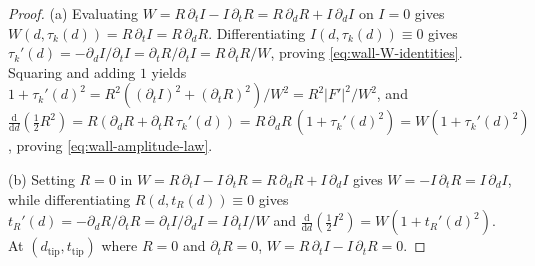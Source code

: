 \documentclass[11pt,reqno]{amsart}
\theoremstyle{definition}
\theoremstyle{remark}
\numberwithin{equation}{section}
\newcommand{\dd}{\mathrm{d}}
\begin{document}
\begin{proof}
(a) Evaluating $W = R\,\partial_t I - I\,\partial_t R = R\,\partial_d R + I\,\partial_d I$ on $I=0$ gives $W(d,\tau_k(d)) = R\,\partial_t I = R\,\partial_d R$. Differentiating $I(d,\tau_k(d))\equiv 0$ gives $\tau_k'(d) = -\partial_d I/\partial_t I = \partial_t R/\partial_t I = R\,\partial_t R / W$, proving \eqref{eq:wall-W-identities}. Squaring and adding $1$ yields $1 + \tau_k'(d)^2 = R^2((\partial_t I)^2 + (\partial_t R)^2)/W^2 = R^2|F'|^2/W^2$, and $\frac{\dd}{\dd d}(\frac{1}{2}R^2) = R(\partial_d R + \partial_t R\,\tau_k'(d)) = R\,\partial_d R\,(1 + \tau_k'(d)^2) = W(1 + \tau_k'(d)^2)$, proving \eqref{eq:wall-amplitude-law}.

(b) Setting $R=0$ in $W = R\,\partial_t I - I\,\partial_t R = R\,\partial_d R + I\,\partial_d I$ gives $W = -I\,\partial_t R = I\,\partial_d I$, while differentiating $R(d,t_R(d))\equiv 0$ gives $t_R'(d) = -\partial_d R/\partial_t R = \partial_t I/\partial_d I = I\,\partial_t I / W$ and $\frac{\dd}{\dd d}(\frac{1}{2}I^2) = W(1 + t_R'(d)^2)$. At $(d_{\mathrm{tip}},t_{\mathrm{tip}})$ where $R=0$ and $\partial_t R = 0$, $W = R\,\partial_t I - I\,\partial_t R = 0$.
\end{proof}
\end{document}
